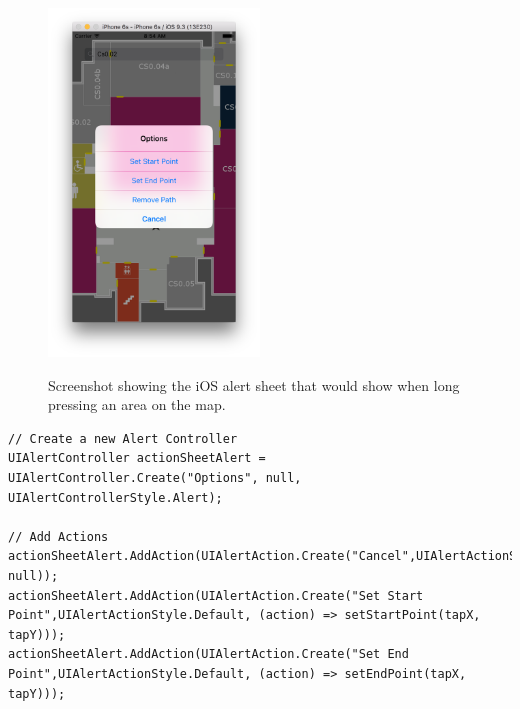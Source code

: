 \documentclass[main.tex]{subfiles}
\begin{document}
\begin{figure}[H]
\centering
\includegraphics[width=0.5\textwidth]{images-implementation/IOSAlertSheet.png}
\label{IOSAlertSheet}
\caption{Screenshot showing the iOS alert sheet that would show when long pressing an area on the map.}
\end{figure}

\begin{lstlisting}
// Create a new Alert Controller
UIAlertController actionSheetAlert = UIAlertController.Create("Options", null, UIAlertControllerStyle.Alert);

// Add Actions
actionSheetAlert.AddAction(UIAlertAction.Create("Cancel",UIAlertActionStyle.Cancel, null));
actionSheetAlert.AddAction(UIAlertAction.Create("Set Start Point",UIAlertActionStyle.Default, (action) => setStartPoint(tapX, tapY)));
actionSheetAlert.AddAction(UIAlertAction.Create("Set End Point",UIAlertActionStyle.Default, (action) => setEndPoint(tapX, tapY)));
\end{lstlisting}
\end{document}
